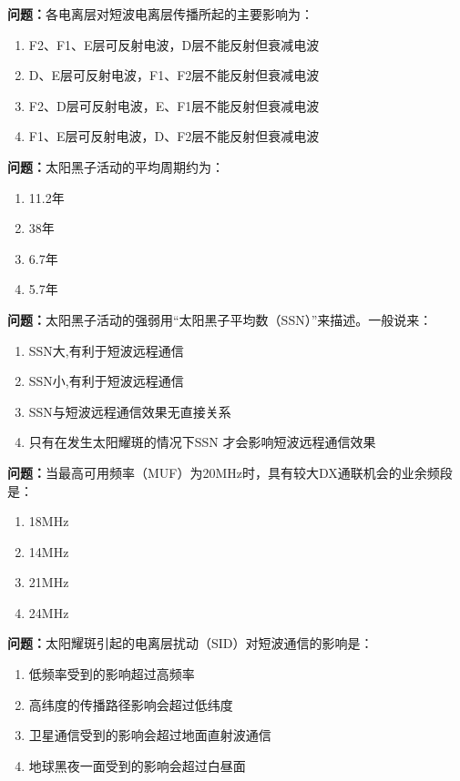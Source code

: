\bigskip


\noindent\textbf{问题：}各电离层对短波电离层传播所起的主要影响为：
\begin{enumerate}[label=\Alph*), leftmargin=3em]
\item F2、F1、E层可反射电波，D层不能反射但衰减电波
\item D、E层可反射电波，F1、F2层不能反射但衰减电波
\item F2、D层可反射电波，E、F1层不能反射但衰减电波
\item F1、E层可反射电波，D、F2层不能反射但衰减电波
\end{enumerate}

\bigskip


\noindent\textbf{问题：}太阳黑子活动的平均周期约为：
\begin{enumerate}[label=\Alph*), leftmargin=3em]
\item 11.2年
\item 38年
\item 6.7年
\item 5.7年
\end{enumerate}

\bigskip


\noindent\textbf{问题：}太阳黑子活动的强弱用“太阳黑子平均数（SSN）”来描述。一般说来：
\begin{enumerate}[label=\Alph*), leftmargin=3em]
\item SSN大,有利于短波远程通信
\item SSN小,有利于短波远程通信
\item SSN与短波远程通信效果无直接关系
\item 只有在发生太阳耀斑的情况下SSN 才会影响短波远程通信效果
\end{enumerate}

\bigskip


\noindent\textbf{问题：}当最高可用频率（MUF）为20MHz时，具有较大DX通联机会的业余频段是：
\begin{enumerate}[label=\Alph*), leftmargin=3em]
\item 18MHz
\item 14MHz
\item 21MHz
\item 24MHz
\end{enumerate}

\bigskip


\noindent\textbf{问题：}太阳耀斑引起的电离层扰动（SID）对短波通信的影响是：
\begin{enumerate}[label=\Alph*), leftmargin=3em]
\item 低频率受到的影响超过高频率
\item 高纬度的传播路径影响会超过低纬度
\item 卫星通信受到的影响会超过地面直射波通信
\item 地球黑夜一面受到的影响会超过白昼面
\end{enumerate}


